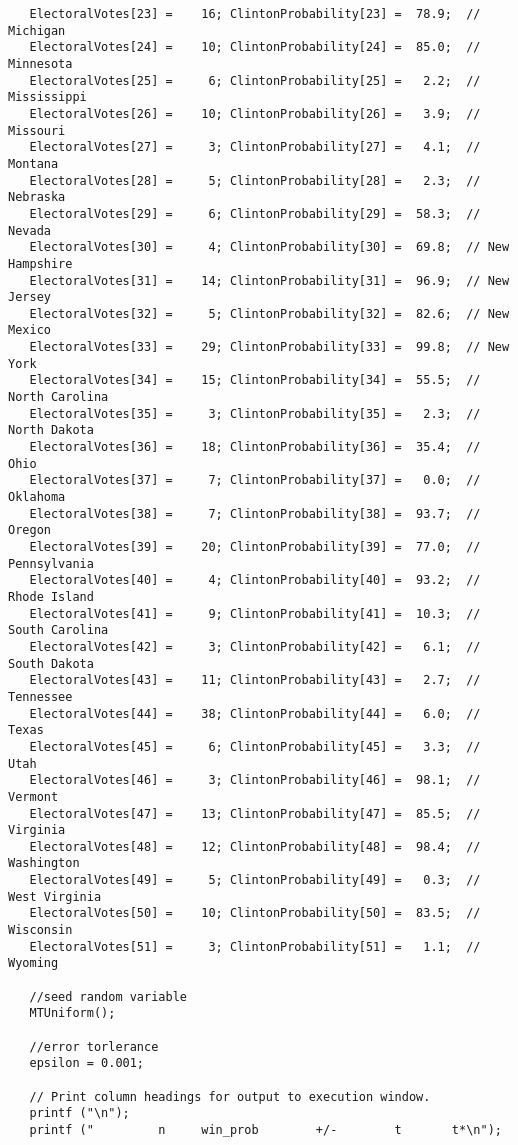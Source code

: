 \documentclass{report}
\begin{document}
\begin{lstlisting}
   ElectoralVotes[23] =    16; ClintonProbability[23] =  78.9;  // Michigan
   ElectoralVotes[24] =    10; ClintonProbability[24] =  85.0;  // Minnesota
   ElectoralVotes[25] =     6; ClintonProbability[25] =   2.2;  // Mississippi
   ElectoralVotes[26] =    10; ClintonProbability[26] =   3.9;  // Missouri
   ElectoralVotes[27] =     3; ClintonProbability[27] =   4.1;  // Montana
   ElectoralVotes[28] =     5; ClintonProbability[28] =   2.3;  // Nebraska
   ElectoralVotes[29] =     6; ClintonProbability[29] =  58.3;  // Nevada
   ElectoralVotes[30] =     4; ClintonProbability[30] =  69.8;  // New Hampshire
   ElectoralVotes[31] =    14; ClintonProbability[31] =  96.9;  // New Jersey
   ElectoralVotes[32] =     5; ClintonProbability[32] =  82.6;  // New Mexico
   ElectoralVotes[33] =    29; ClintonProbability[33] =  99.8;  // New York
   ElectoralVotes[34] =    15; ClintonProbability[34] =  55.5;  // North Carolina
   ElectoralVotes[35] =     3; ClintonProbability[35] =   2.3;  // North Dakota
   ElectoralVotes[36] =    18; ClintonProbability[36] =  35.4;  // Ohio
   ElectoralVotes[37] =     7; ClintonProbability[37] =   0.0;  // Oklahoma
   ElectoralVotes[38] =     7; ClintonProbability[38] =  93.7;  // Oregon
   ElectoralVotes[39] =    20; ClintonProbability[39] =  77.0;  // Pennsylvania
   ElectoralVotes[40] =     4; ClintonProbability[40] =  93.2;  // Rhode Island
   ElectoralVotes[41] =     9; ClintonProbability[41] =  10.3;  // South Carolina
   ElectoralVotes[42] =     3; ClintonProbability[42] =   6.1;  // South Dakota
   ElectoralVotes[43] =    11; ClintonProbability[43] =   2.7;  // Tennessee
   ElectoralVotes[44] =    38; ClintonProbability[44] =   6.0;  // Texas
   ElectoralVotes[45] =     6; ClintonProbability[45] =   3.3;  // Utah
   ElectoralVotes[46] =     3; ClintonProbability[46] =  98.1;  // Vermont
   ElectoralVotes[47] =    13; ClintonProbability[47] =  85.5;  // Virginia
   ElectoralVotes[48] =    12; ClintonProbability[48] =  98.4;  // Washington
   ElectoralVotes[49] =     5; ClintonProbability[49] =   0.3;  // West Virginia
   ElectoralVotes[50] =    10; ClintonProbability[50] =  83.5;  // Wisconsin
   ElectoralVotes[51] =     3; ClintonProbability[51] =   1.1;  // Wyoming

   //seed random variable
   MTUniform();
   
   //error torlerance
   epsilon = 0.001;

   // Print column headings for output to execution window.
   printf ("\n");
   printf ("         n     win_prob        +/-        t       t*\n");


\end{lstlisting}
\end{document}
